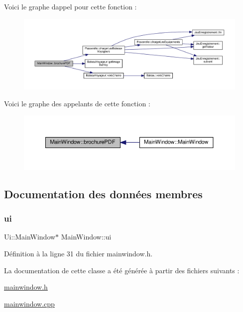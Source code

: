 Voici le graphe d\textquotesingle{}appel pour cette fonction \+:\nopagebreak
\begin{figure}[H]
\begin{center}
\leavevmode
\includegraphics[width=350pt]{class_main_window_a6db0e3a1a7ce60c36d151d1ae618f16c_cgraph}
\end{center}
\end{figure}
Voici le graphe des appelants de cette fonction \+:\nopagebreak
\begin{figure}[H]
\begin{center}
\leavevmode
\includegraphics[width=350pt]{class_main_window_a6db0e3a1a7ce60c36d151d1ae618f16c_icgraph}
\end{center}
\end{figure}


\subsection{Documentation des données membres}
\mbox{\label{class_main_window_a35466a70ed47252a0191168126a352a5}} 
\subsubsection{\texorpdfstring{ui}{ui}}
{\footnotesize\ttfamily Ui\+::\+Main\+Window$\ast$ Main\+Window\+::ui\hspace{0.3cm}{\ttfamily [private]}}



Définition à la ligne 31 du fichier mainwindow.\+h.



La documentation de cette classe a été générée à partir des fichiers suivants \+:\begin{DoxyCompactItemize}
\item 
\hyperlink{mainwindow_8h}{mainwindow.\+h}\item 
\hyperlink{mainwindow_8cpp}{mainwindow.\+cpp}\end{DoxyCompactItemize}
